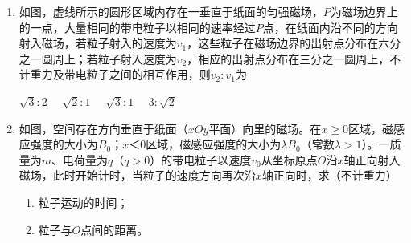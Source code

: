 \begin{enumerate}[leftmargin=0em]
\renewcommand{\labelenumi}{\arabic{enumi}.}
\item 
{}
如图，虚线所示的圆形区域内存在一垂直于纸面的匀强磁场，$ P $为磁场边界上的一点，大量相同的带电粒子以相同的速率经过$ P $点，在纸面内沿不同的方向射入磁场，若粒子射入的速度为$ v_{1} $，这些粒子在磁场边界的出射点分布在六分之一圆周上；若粒子射入速度为$ v_{2} $，相应的出射点分布在三分之一圆周上，不计重力及带电粒子之间的相互作用，则$v _ { 2 }: v _ { 1 }$为  


\begin{minipage}[h!]{0.7\linewidth}
\vspace{0.3em}
\fourchoices
{$\sqrt { 3 }: 2 \quad$}
{$\sqrt { 2 }: 1 \quad$}
{$\sqrt { 3 }: 1 \quad$}
{$3: \sqrt { 2 }$}

\vspace{0.3em}
\end{minipage}
\hfill
\begin{minipage}[h!]{0.3\linewidth}
\flushright
\vspace{0.3em}

\vspace{0.3em}
\end{minipage}


\item
{}
如图，空间存在方向垂直于纸面（$ xOy $平面）向里的磁场。在$ x \geq 0 $区域，磁感应强度的大小为$ B_{0} $；$ x $＜$ 0 $区域，磁感应强度的大小为$ \lambda B_{0} $（常数$ \lambda> 1 $）。一质量为$ m $、电荷量为$ q $（$ q > 0 $）的带电粒子以速度$ v_{0} $从坐标原点$ O $沿$ x $轴正向射入磁场，此时开始计时，当粒子的速度方向再次沿$ x $轴正向时，求（不计重力）
\begin{enumerate}
\renewcommand{\labelenumi}{\arabic{enumi}.}
\item
粒子运动的时间；
\item 
粒子与$ O $点间的距离。




\end{enumerate}
\end{enumerate}
